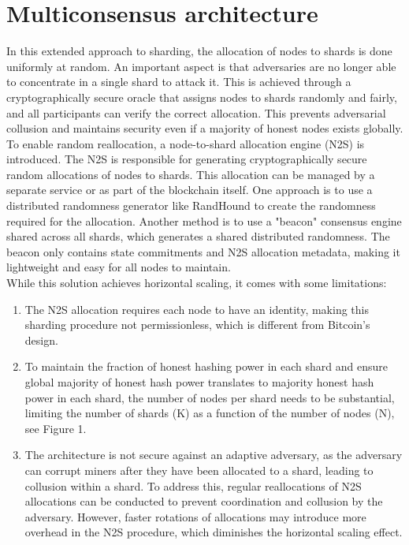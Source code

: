 \documentclass{report}
\begin{document}
\section{Multiconsensus architecture} 
In this extended approach to sharding, the allocation of nodes to shards is done uniformly at random. An important aspect is that adversaries are no longer able to concentrate in a single shard to attack it. This is achieved through a cryptographically secure oracle that assigns nodes to shards randomly and fairly, and all participants can verify the correct allocation. This prevents adversarial collusion and maintains security even if a majority of honest nodes exists globally.\\
To enable random reallocation, a node-to-shard allocation engine (N2S) is introduced. The N2S is responsible for generating cryptographically secure random allocations of nodes to shards. This allocation can be managed by a separate service or as part of the blockchain itself. One approach is to use a distributed randomness generator like RandHound to create the randomness required for the allocation. Another method is to use a "beacon" consensus engine shared across all shards, which generates a shared distributed randomness. The beacon only contains state commitments and N2S allocation metadata, making it lightweight and easy for all nodes to maintain.\\
While this solution achieves horizontal scaling, it comes with some limitations:
\begin{enumerate}
	\item The N2S allocation requires each node to have an identity, making this sharding procedure not permissionless, which is different from Bitcoin's design.
	\item To maintain the fraction of honest hashing power in each shard and ensure global majority of honest hash power translates to majority honest hash power in each shard, the number of nodes per shard needs to be substantial, limiting the number of shards (K) as a function of the number of nodes (N), see Figure 1.
	\item The architecture is not secure against an adaptive adversary, as the adversary can corrupt miners after they have been allocated to a shard, leading to collusion within a shard. To address this, regular reallocations of N2S allocations can be conducted to prevent coordination and collusion by the adversary. However, faster rotations of allocations may introduce more overhead in the N2S procedure, which diminishes the horizontal scaling effect.
\end{enumerate}
\end{document}
